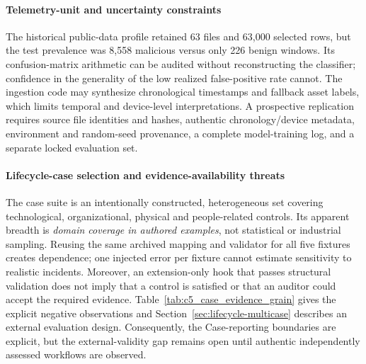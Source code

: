 \documentclass[12pt,a4paper]{article}
\begin{document}
\paragraph{Telemetry-unit and uncertainty constraints} The historical public-data profile retained 63 files and 63,000 selected rows, but the test prevalence was 8,558 malicious versus only 226 benign windows. Its confusion-matrix arithmetic can be audited without reconstructing the classifier; confidence in the generality of the low realized false-positive rate cannot. The ingestion code may synthesize chronological timestamps and fallback asset labels, which limits temporal and device-level interpretations. A prospective replication requires source file identities and hashes, authentic chronology/device metadata, environment and random-seed provenance, a complete model-training log, and a separate locked evaluation set.

\paragraph{Lifecycle-case selection and evidence-availability threats}
The case suite is an intentionally constructed, heterogeneous set covering technological, organizational, physical and people-related controls. Its apparent breadth is \emph{domain coverage in authored examples}, not statistical or industrial sampling. Reusing the same archived mapping and validator for all five fixtures creates dependence; one injected error per fixture cannot estimate sensitivity to realistic incidents. Moreover, an extension-only hook that passes structural validation does not imply that a control is satisfied or that an auditor could accept the required evidence. Table~\ref{tab:c5_case_evidence_grain} gives the explicit negative observations and Section~\ref{sec:lifecycle-multicase} describes an external evaluation design. Consequently, the Case-reporting boundaries are explicit, but the external-validity gap remains open until authentic independently assessed workflows are observed.
\end{document}
